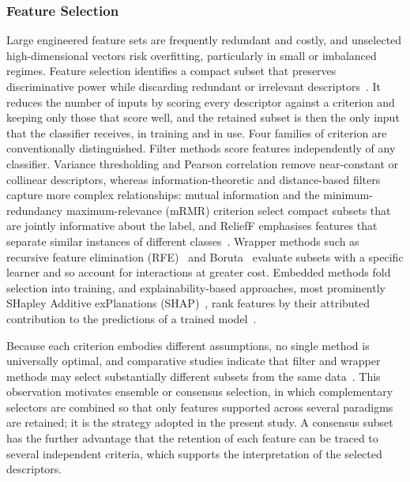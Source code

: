 \subsubsection{Feature Selection}
\label{sec:chap2FeatureSelection}
Large engineered feature sets are frequently redundant and costly, and unselected high-dimensional vectors risk overfitting, particularly in small or imbalanced regimes. Feature selection identifies a compact subset that preserves discriminative power while discarding redundant or irrelevant descriptors~\cite{guyon2003variable,wani2025dimensionality}. It reduces the number of inputs by scoring every descriptor against a criterion and keeping only those that score well, and the retained subset is then the only input that the classifier receives, in training and in use. Four families of criterion are conventionally distinguished. Filter methods score features independently of any classifier. Variance thresholding and Pearson correlation remove near-constant or collinear descriptors, whereas information-theoretic and distance-based filters capture more complex relationships: mutual information and the minimum-redundancy maximum-relevance (mRMR) criterion select compact subsets that are jointly informative about the label, and ReliefF emphasises features that separate similar instances of different classes~\cite{peng2005mrmr,li2022relieff,altheneyan2025feature}. Wrapper methods such as recursive feature elimination (RFE)~\cite{guyon2002rfe} and Boruta~\cite{kursa2010boruta} evaluate subsets with a specific learner and so account for interactions at greater cost. Embedded methods fold selection into training, and explainability-based approaches, most prominently SHapley Additive exPlanations (SHAP)~\cite{lundberg2017shap}, rank features by their attributed contribution to the predictions of a trained model~\cite{cai2018feature}.

Because each criterion embodies different assumptions, no single method is universally optimal, and comparative studies indicate that filter and wrapper methods may select substantially different subsets from the same data~\cite{altheneyan2025feature}. This observation motivates ensemble or consensus selection, in which complementary selectors are combined so that only features supported across several paradigms are retained; it is the strategy adopted in the present study. A consensus subset has the further advantage that the retention of each feature can be traced to several independent criteria, which supports the interpretation of the selected descriptors.

